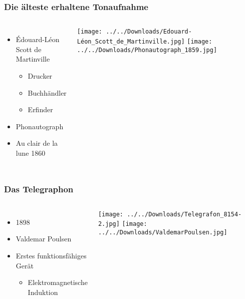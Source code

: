 \documentclass{beamer}
\begin{document}
\begin{frame}
\frametitle{Die älteste erhaltene Tonaufnahme}
\begin{columns}
	\begin{itemize}
	\Large	
	\item Édouard-Léon Scott de Martinville
		\begin{itemize}
		\item Drucker
		\item Buchhändler
		\item Erfinder
		\end{itemize}		
	\vspace{0.5cm}\item Phonautograph
	\vspace{0.5cm}\item Au clair de la lune 1860					
	\end{itemize}
		\texttt{[image: ../../Downloads/Edouard-Léon\_Scott\_de\_Martinville.jpg]} 
		\texttt{[image: ../../Downloads/Phonautograph\_1859.jpg]} 
\end{columns}	

\end{frame}

\begin{frame}
\frametitle{Das Telegraphon}
\begin{columns}
	\begin{itemize}
		\Large		
		\item 1898		
		\vspace{0.5cm}\item Valdemar Poulsen
		\vspace{0.5cm}\item Erstes funktionsfähiges Gerät
		\begin{itemize}
			\item Elektromagnetische Induktion
		\end{itemize}							
	\end{itemize}
		\texttt{[image: ../../Downloads/Telegrafon\_8154-2.jpg]} 
		\texttt{[image: ../../Downloads/ValdemarPoulsen.jpg]} 
\end{columns}	
\end{frame}
\end{document}
